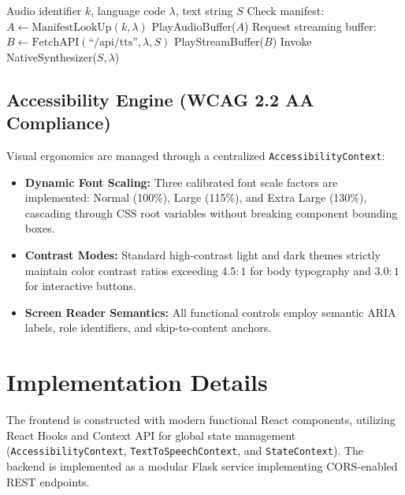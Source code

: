 \documentclass[conference]{IEEEtran}
\begin{document}
\begin{algorithm}[htbp]
\caption{Triple-Tier Multilingual Audio Resolution}
\label{alg:tts}
\begin{algorithmic}[1]
\REQUIRE Audio identifier $k$, language code $\lambda$, text string $S$
\STATE Check manifest: $A \leftarrow \text{ManifestLookUp}(k, \lambda)$
    \STATE PlayAudioBuffer($A$) 
    \RETURN
\ENDIF
\STATE Request streaming buffer: $B \leftarrow \text{FetchAPI}(\text{``/api/tts''}, \lambda, S)$
    \STATE PlayStreamBuffer($B$) 
    \RETURN
\ENDIF
\STATE Invoke NativeSynthesizer($S, \lambda$) 
\end{algorithmic}
\end{algorithm}

\subsection{Accessibility Engine (WCAG 2.2 AA Compliance)}
Visual ergonomics are managed through a centralized \texttt{AccessibilityContext}:
\begin{itemize}
    \item \textbf{Dynamic Font Scaling:} Three calibrated font scale factors are implemented: Normal (100\%), Large (115\%), and Extra Large (130\%), cascading through CSS root variables without breaking component bounding boxes.
    \item \textbf{Contrast Modes:} Standard high-contrast light and dark themes strictly maintain color contrast ratios exceeding $4.5:1$ for body typography and $3.0:1$ for interactive buttons.
    \item \textbf{Screen Reader Semantics:} All functional controls employ semantic ARIA labels, role identifiers, and skip-to-content anchors.
\end{itemize}

\section{Implementation Details}
The frontend is constructed with modern functional React components, utilizing React Hooks and Context API for global state management (\texttt{AccessibilityContext}, \texttt{TextToSpeechContext}, and \texttt{StateContext}). The backend is implemented as a modular Flask service implementing CORS-enabled REST endpoints.
\end{document}
